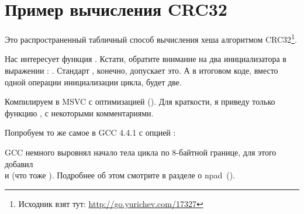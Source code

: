 \section{Пример вычисления CRC32}
\label{sec:CRC32}

\newcommand{\URLCRCSRC}{\url{http://go.yurichev.com/17327}}

Это распространенный табличный способ вычисления хеша алгоритмом 
CRC32\footnote{Исходник взят тут: \URLCRCSRC}.



Нас интересует функция . 
Кстати, обратите внимание на два инициализатора в выражении : . 
Стандарт \CCpp, конечно, допускает это. А в итоговом коде, вместо одной операции инициализации цикла, будет две.

Компилируем в MSVC с оптимизацией (\Ox). 
Для краткости, я приведу только функцию , с некоторыми комментариями.



Попробуем то же самое в GCC 4.4.1 с опцией \Othree:



GCC немного выровнял начало тела цикла по 8-байтной границе, для этого добавил \\
\NOP и  (что тоже ). 
Подробнее об этом смотрите в разделе о npad~().

